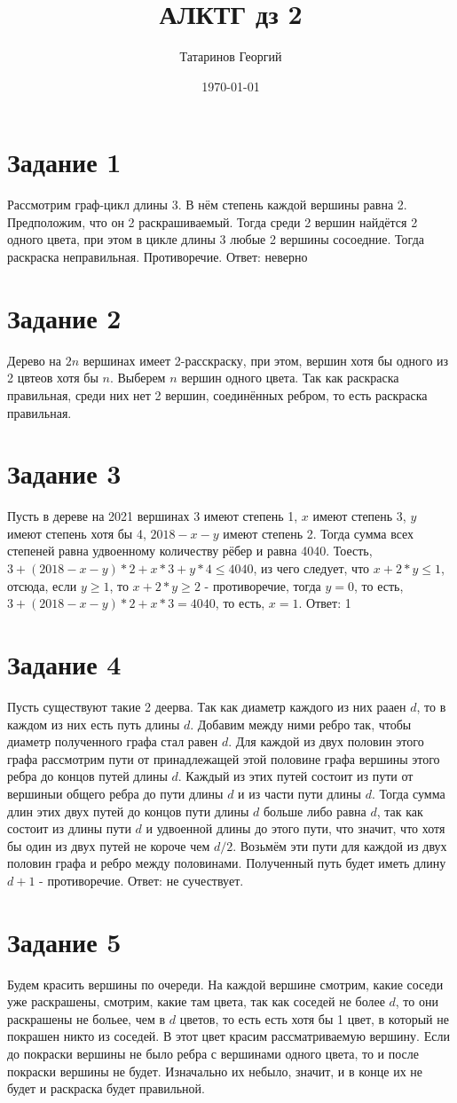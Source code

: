 \documentclass[a4paper, 12pt]{article}
\title{АЛКТГ дз 2}
\author{Татаринов Георгий}
\date{\today}
\begin{document}
	\section*{Задание 1}
		Рассмотрим граф-цикл длины 3. В нём степень каждой вершины равна 2. Предположим, что он 2 раскрашиваемый. Тогда среди 2 вершин найдётся 2 одного цвета, при этом в цикле длины 3 любые 2 вершины сосоедние. Тогда раскраска неправильная. Противоречие.
		Ответ: неверно
	\section*{Задание 2}
		Дерево на $2n$ вершинах имеет 2-расскраску, при этом, вершин хотя бы одного из 2 цвтеов хотя бы $n$. Выберем $n$ вершин одного цвета. Так как раскраска правильная, среди них нет 2 вершин, соединённых ребром, то есть раскраска правильная.
	\section*{Задание 3}
		Пусть в дереве на 2021 вершинах 3 имеют степень 1, $x$ имеют степень 3, $y$ имеют степень хотя бы 4, $2018-x-y$ имеют степень 2.
		Тогда сумма всех степеней равна удвоенному количеству рёбер и равна 4040. Тоесть, $3+(2018-x-y)*2+x*3+y*4\leq4040$, из чего следует, что $x+2*y\leq1$, отсюда, если $y\geq1$, то $x+2*y\geq2$ - противоречие, тогда $y=0$, то есть, $3+(2018-x-y)*2+x*3=4040$, то есть, $x=1$.
		Ответ: 1
	\section*{Задание 4}
		Пусть существуют такие 2 деерва. Так как диаметр каждого из них рааен $d$, то в каждом из них есть путь длины $d$. Добавим между ними ребро так, чтобы диаметр полученного графа стал равен $d$. Для каждой из двух половин этого графа рассмотрим пути от принадлежащей этой половине графа вершины этого ребра до концов путей длины $d$. Каждый из этих путей состоит из пути от вершиныи общего ребра до пути длины $d$ и из части пути длины $d$. Тогда сумма длин этих двух путей до концов пути длины $d$ больше либо равна $d$, так как состоит из длины пути $d$ и удвоенной длины до этого пути, что значит, что хотя бы один из двух путей не короче чем $d/2$. Возьмём эти пути для каждой из двух половин графа и ребро между половинами. Полученный путь будет иметь длину $d+1$ - противоречие.
		Ответ: не сучествует.
	\section*{Задание 5}
		Будем красить вершины по очереди. На каждой вершине смотрим, какие соседи уже раскрашены, смотрим, какие там цвета, так как соседей не более $d$, то они раскрашены не больее, чем в $d$ цветов, то есть есть хотя бы 1 цвет, в который не покрашен никто из соседей. В этот цвет красим рассматриваемую вершину. Если до покраски вершины не было ребра с вершинами одного цвета, то и после покраски вершины не будет. Изначально их небыло, значит, и в конце их не будет и раскраска будет правильной.
\end{document}
